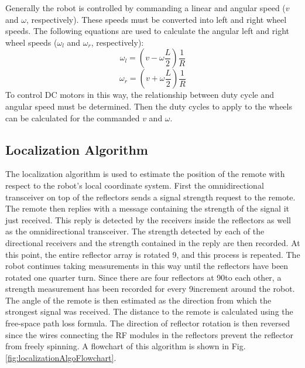 \vspace*{12pt}
\noindent
Generally the robot is controlled by commanding a linear and angular speed ($v$ and $\omega$, respectively). These speeds must be converted into left and right wheel speeds. The following equations are used to calculate the angular left and right wheel speeds ($\omega_l$ and $\omega_r$, respectively):
$$\omega_l = \left(v - \omega\frac{L}{2}\right)\frac{1}{R}$$
$$\omega_r = \left(v + \omega\frac{L}{2}\right)\frac{1}{R}$$
To control DC motors in this way, the relationship between duty cycle and angular speed must be determined. Then the duty cycles to apply to the wheels can be calculated for the commanded $v$ and $\omega$.

\subsection{Localization Algorithm}
The localization algorithm is used to estimate the position of the remote with respect to the robot's local coordinate system. First the omnidirectional transceiver on top of the reflectors sends a signal strength request to the remote. The remote then replies with a message containing the strength of the signal it just received. This reply is detected by the receivers inside the reflectors as well as the omnidirectional transceiver. The strength detected by each of the directional receivers and the strength contained in the reply are then recorded. At this point, the entire reflector array is rotated 9\textdegree, and this process is repeated. The robot continues taking measurements in this way until the reflectors have been rotated one quarter turn. Since there are four reflectors at 90\textdegree to each other, a strength measurement has been recorded for every 9\textdegree increment around the robot. The angle of the remote is then estimated as the direction from which the strongest signal was received. The distance to the remote is calculated using the free-space path loss formula. The direction of reflector rotation is then reversed since the wires connecting the RF modules in the reflectors prevent the reflector from freely spinning. A flowchart of this algorithm is shown in Fig. \ref{fig:localizationAlgoFlowchart}.
